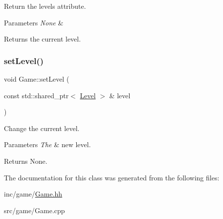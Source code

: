 Return the level\textquotesingle{}s attribute. 


\begin{DoxyParams}{Parameters}
{\em None} & \\
\hline
\end{DoxyParams}
\begin{DoxyReturn}{Returns}
the current level. 
\end{DoxyReturn}
\mbox{\label{classGame_a9b3ac5684d403e8b6ecdc83f268c420f}} 
\subsubsection{\texorpdfstring{set\+Level()}{setLevel()}}
{\footnotesize\ttfamily void Game\+::set\+Level (\begin{DoxyParamCaption}\item[{const std\+::shared\+\_\+ptr$<$ \hyperlink{classLevel}{Level} $>$ \&}]{level }\end{DoxyParamCaption})}



Change the current level. 


\begin{DoxyParams}{Parameters}
{\em The} & new level.\\
\hline
\end{DoxyParams}
\begin{DoxyReturn}{Returns}
None. 
\end{DoxyReturn}


The documentation for this class was generated from the following files\+:\begin{DoxyCompactItemize}
\item 
inc/game/\hyperlink{Game_8hh}{Game.\+hh}\item 
src/game/Game.\+cpp\end{DoxyCompactItemize}
